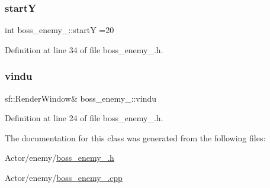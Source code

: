 \subsubsection{\texorpdfstring{startY}{startY}}
{\footnotesize\ttfamily int boss\+\_\+enemy\+\_\+::startY =20}



Definition at line 34 of file boss\+\_\+enemy\+\_.\+h.

\hypertarget{classboss__enemy__2_a009ce9fc4bc3da63a2380221f38df441}{}\label{classboss__enemy__2_a009ce9fc4bc3da63a2380221f38df441} 
\subsubsection{\texorpdfstring{vindu}{vindu}}
{\footnotesize\ttfamily sf\+::\+Render\+Window\& boss\+\_\+enemy\+\_\+::vindu}



Definition at line 24 of file boss\+\_\+enemy\+\_.\+h.



The documentation for this class was generated from the following files\+:\begin{DoxyCompactItemize}
\item 
Actor/enemy/\hyperlink{boss__enemy__2_8h}{boss\+\_\+enemy\+\_.\+h}\item 
Actor/enemy/\hyperlink{boss__enemy__2_8cpp}{boss\+\_\+enemy\+\_.\+cpp}\end{DoxyCompactItemize}
